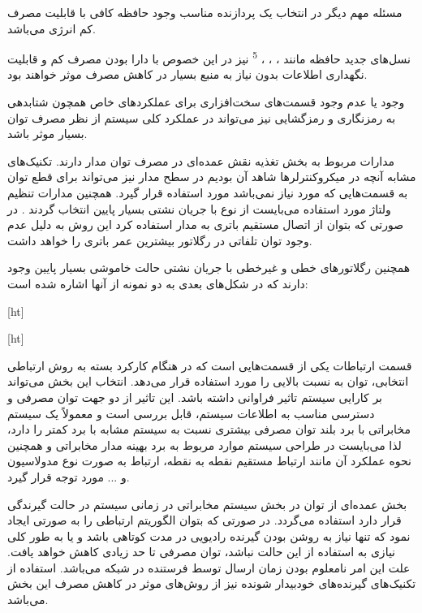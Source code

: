 مسئله مهم دیگر در انتخاب یک پردازنده مناسب وجود حافظه کافی با قابلیت مصرف کم انرژی می‌باشد. 

نسل‌های جدید حافظه مانند ، ، ، \textsuperscript{5} نیز در این خصوص با دارا بودن مصرف کم و قابلیت نگهداری اطلاعات بدون نیاز به منبع بسیار در کاهش مصرف موثر خواهند بود.\lr{[1]}


وجود یا عدم وجود قسمت‌های سخت‌افزاری برای عملکردهای خاص همچون شتابدهی به رمزنگاری و رمزگشایی نیز می‌تواند در عملکرد کلی سیستم از نظر مصرف توان بسیار موثر باشد. 


مدارات مربوط به بخش تغذیه نقش عمده‌ای در مصرف توان  مدار دارند. تکنیک‌های  مشابه آنچه در میکروکنترلرها شاهد آن بودیم در سطح مدار نیز می‌تواند برای قطع توان به قسمت‌هایی که مورد نیاز نمی‌باشد مورد استفاده قرار گیرد. همچنین مدارات تنظیم ولتاژ مورد استفاده می‌بایست از نوع با جریان نشتی بسیار پایین انتخاب گردند . در صورتی که بتوان از اتصال مستقیم باتری به مدار استفاده کرد این روش به دلیل عدم وجود توان تلفاتی در رگلاتور بیشترین عمر باتری را خواهد داشت.

همچنین رگلاتورهای خطی و غیرخطی با جریان نشتی حالت خاموشی بسیار پایین وجود دارند که در شکل‌های بعدی به دو نمونه از آنها اشاره شده است:

[ht]



[ht]




قسمت ارتباطات یکی از قسمت‌هایی است که در هنگام کارکرد بسته به روش ارتباطی انتخابی، توان به نسبت بالایی را مورد استفاده قرار می‌دهد. انتخاب این بخش می‌تواند بر کارایی سیستم تاثیر فراوانی داشته باشد. این تاثیر از دو جهت توان مصرفی و دسترسی مناسب به اطلاعات سیستم، قابل بررسی است و معمولاً یک سیستم مخابراتی با برد بلند توان مصرفی بیشتری نسبت به سیستم مشابه با برد کمتر را دارد، لذا می‌بایست در طراحی سیستم موارد مربوط به برد بهینه مدار مخابراتی و همچنین نحوه عملکرد آن مانند ارتباط مستقیم نقطه به نقطه، ارتباط به صورت  نوع مدولاسیون و ... مورد توجه قرار گیرد.

بخش عمده‌ای از توان در بخش سیستم مخابراتی در زمانی سیستم در حالت گیرندگی قرار دارد استفاده می‌گردد. در صورتی که بتوان الگوریتم ارتباطی را به صورتی ایجاد نمود که تنها نیاز به روشن بودن گیرنده رادیویی در مدت کوتاهی باشد و یا به طور کلی نیازی به استفاده از این حالت نباشد، توان مصرفی تا حد زیادی کاهش خواهد یافت. علت این امر نامعلوم بودن زمان ارسال توسط فرستنده در شبکه می‌باشد. استفاده از تکنیک‌های گیرنده‌های خودبیدار شونده نیز از روش‌های موثر در کاهش مصرف این بخش می‌باشد. 





